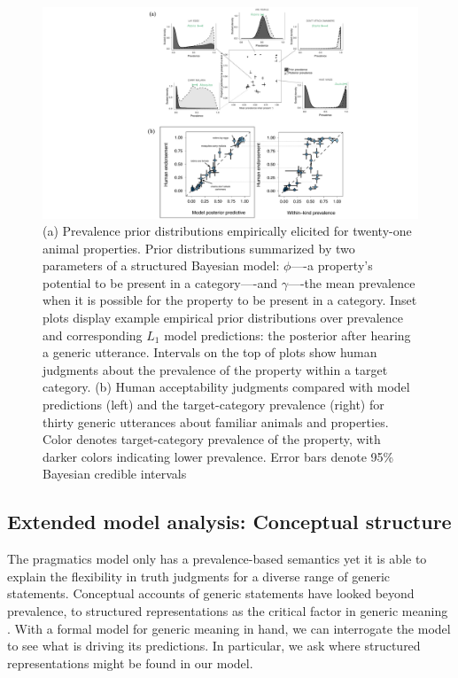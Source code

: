\documentclass[12pt,letterpaper]{article}
\begin{document}
\begin{figure}
\centering
    \includegraphics[width=\columnwidth]{generics-prior-prevalence-tj.pdf}
    \caption{(a) 
    Prevalence prior distributions empirically elicited for twenty-one animal properties.
    Prior distributions summarized by two parameters of a structured Bayesian model: $\phi$----a property's potential to be present in a category----and $\gamma$----the mean prevalence when it is possible for the property to be present in a category.
    Inset plots display example empirical prior distributions over prevalence and corresponding $L_1$ model predictions: the posterior after hearing a generic utterance. 
    Intervals on the top of plots show human judgments about the prevalence of the property within a target category.
    (b)
    Human acceptability judgments compared with model predictions (left) and the target-category prevalence (right) for thirty generic utterances about familiar animals and properties. 
    Color denotes target-category prevalence of the property, with darker colors indicating lower prevalence. 
     Error bars denote 95\% Bayesian credible intervals
    }
  \label{fig:commongenerics}

\end{figure}



\subsection*{Extended model analysis: Conceptual structure}

The pragmatics model only has a prevalence-based semantics yet it is able to explain the flexibility in truth judgments for a diverse range of generic statements.
Conceptual accounts of generic statements have looked beyond prevalence, to structured representations as the critical factor in generic meaning \cite{Leslie2007, Prasada2013}. 
With a formal model for generic meaning in hand, we can interrogate the model to see what is driving its predictions.
In particular, we ask where structured representations might be found in our model.
\end{document}
